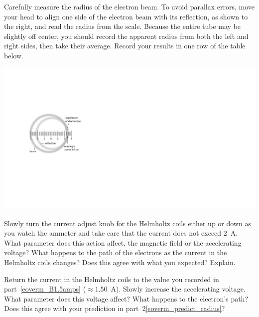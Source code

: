 \begin{enumerate}[labparts]
\begin{minipage}{0.55\textwidth}
\item Carefully measure the radius of the electron beam.
To avoid parallax errors, move your head to align one side of the electron
beam with its reflection, as shown to the right, and read the radius from the scale.
Because the entire tube may be slightly off center, you should record the apparent radius from both the left and right sides, then take their average. 
Record your results in one row of the table below. \label{eoverm_parallax}
\end{minipage}
\begin{minipage}{0.44\textwidth}
\hfill\includegraphics[scale=0.9]{eoverm/aligning_beam_and_reflection.pdf}

\end{minipage}

\item Slowly turn the current adjust knob for the Helmholtz
coils either up or down as you watch the ammeter and take care that
the current does not exceed 2~A.
What parameter does this action affect, the magnetic field or the
accelerating voltage?
What happens to the path of the electrons as the current in the Helmholtz
coils changes? Does this agree with what you expected? Explain.
\answerspace{20mm}

 \item Return the current in the Helmholtz coils to the value you recorded in 
part~\ref{eoverm_B1.5amps} ($\approx 1.50$~A). Slowly increase the accelerating voltage. What parameter 
does this voltage affect? What happens to the electron's path?  Does this agree with your prediction in part~2\ref{eoverm_predict_radius}?
\answerspace{0.5in}


\end{enumerate}
